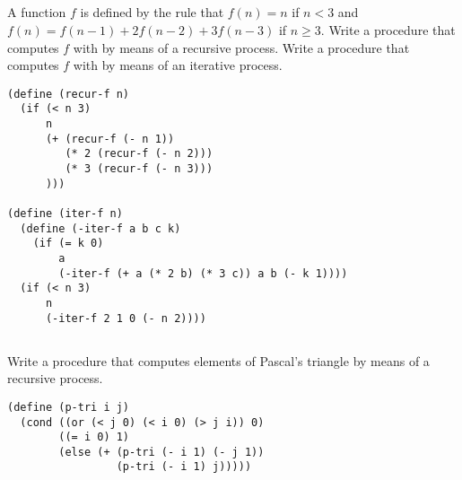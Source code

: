 \documentclass{article}
\begin{document}
\subsection{}
A function $f$ is defined by the rule that $f(n) = n$ if $n < 3$ and $f(n) = f(n - 1) + 2f(n - 2) + 3f(n - 3)$ if $n \geq 3$. Write a procedure that computes $f$ with by means of a recursive process. Write a procedure that computes $f$ with by means of an iterative process.
\begin{lstlisting}
(define (recur-f n)
  (if (< n 3)
      n
      (+ (recur-f (- n 1))
         (* 2 (recur-f (- n 2)))
         (* 3 (recur-f (- n 3)))
      )))

(define (iter-f n)
  (define (-iter-f a b c k)
    (if (= k 0)
        a
        (-iter-f (+ a (* 2 b) (* 3 c)) a b (- k 1))))
  (if (< n 3)
      n
      (-iter-f 2 1 0 (- n 2))))
\end{lstlisting}

\subsection{}
Write a procedure that computes elements of Pascal's triangle by means of a recursive process.
\begin{lstlisting}
(define (p-tri i j)
  (cond ((or (< j 0) (< i 0) (> j i)) 0)
        ((= i 0) 1)
        (else (+ (p-tri (- i 1) (- j 1))
                 (p-tri (- i 1) j)))))
\end{lstlisting}

\end{document}
